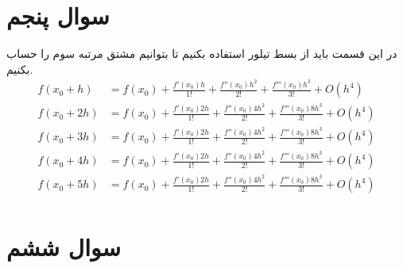 \documentclass[]{article}
\begin{document}
\section*{سوال پنجم}
در این قسمت باید از بسط تیلور استفاده بکنیم تا بتوانیم مشتق مرتبه سوم را حساب بکنیم.
\begin{align*}
    f(x_0 + h)  &= f(x_0) + \frac{f'(x_0)h}{1!} + \frac{f''(x_0)h^2}{2!} + \frac{f'''(x_0)h^3}{3!} + O(h^4)\\
    f(x_0 + 2h) &= f(x_0) + \frac{f'(x_0)2h}{1!} + \frac{f''(x_0)4h^2}{2!} + \frac{f'''(x_0)8h^3}{3!} + O(h^4)\\
    f(x_0 + 3h) &= f(x_0) + \frac{f'(x_0)2h}{1!} + \frac{f''(x_0)4h^2}{2!} + \frac{f'''(x_0)8h^3}{3!} + O(h^4)\\
    f(x_0 + 4h) &= f(x_0) + \frac{f'(x_0)2h}{1!} + \frac{f''(x_0)4h^2}{2!} + \frac{f'''(x_0)8h^3}{3!} + O(h^4)\\
    f(x_0 + 5h) &= f(x_0) + \frac{f'(x_0)2h}{1!} + \frac{f''(x_0)4h^2}{2!} + \frac{f'''(x_0)8h^3}{3!} + O(h^4)\\
\end{align*}
\section*{سوال ششم}
\end{document}
